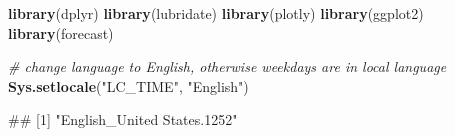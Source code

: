 \documentclass[
]{book}
\newenvironment{Shaded}{\begin{snugshade}}{\end{snugshade}}
\newcommand{\CommentTok}[1]{\textcolor[rgb]{0.56,0.35,0.01}{\textit{#1}}}
\newcommand{\KeywordTok}[1]{\textcolor[rgb]{0.13,0.29,0.53}{\textbf{#1}}}
\newcommand{\NormalTok}[1]{#1}
\newcommand{\StringTok}[1]{\textcolor[rgb]{0.31,0.60,0.02}{#1}}
\let\oldShaded\Shaded
\let\endoldShaded\endShaded
\renewenvironment{Shaded}{\footnotesize\oldShaded}{\endoldShaded}
\let\oldverbatim\verbatim
\let\endoldverbatim\endverbatim
\renewenvironment{verbatim}{\footnotesize\oldverbatim}{\endoldverbatim}
\begin{document}
\begin{Shaded}
\begin{Highlighting}[]
\KeywordTok{library}\NormalTok{(dplyr)}
\KeywordTok{library}\NormalTok{(lubridate)}
\KeywordTok{library}\NormalTok{(plotly)}
\KeywordTok{library}\NormalTok{(ggplot2)}
\KeywordTok{library}\NormalTok{(forecast)}

\CommentTok{# change language to English, otherwise weekdays are in local language}
\KeywordTok{Sys.setlocale}\NormalTok{(}\StringTok{"LC_TIME"}\NormalTok{, }\StringTok{"English"}\NormalTok{)}
\end{Highlighting}
\end{Shaded}

\begin{verbatim}
## [1] "English_United States.1252"
\end{verbatim}
\end{document}
